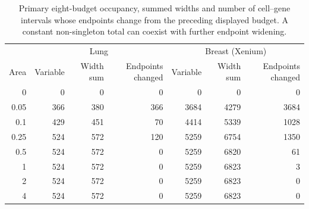 \begin{table}[ht]\centering
\begin{tabular}{rrrrrrr}\toprule
&\multicolumn{3}{c}{Lung}&\multicolumn{3}{c}{Breast (Xenium)}\\
Area&Variable&Width sum&Endpoints changed&Variable&Width sum&Endpoints changed\\\midrule
0 & 0 & 0 & 0 & 0 & 0 & 0\\
0.05 & 366 & 380 & 366 & 3684 & 4279 & 3684\\
0.1 & 429 & 451 & 70 & 4414 & 5339 & 1028\\
0.25 & 524 & 572 & 120 & 5259 & 6754 & 1350\\
0.5 & 524 & 572 & 0 & 5259 & 6820 & 61\\
1 & 524 & 572 & 0 & 5259 & 6823 & 3\\
2 & 524 & 572 & 0 & 5259 & 6823 & 0\\
4 & 524 & 572 & 0 & 5259 & 6823 & 0\\
\bottomrule\end{tabular}
\caption{Primary eight-budget occupancy, summed widths and number of cell--gene intervals whose endpoints change from the preceding displayed budget. A constant non-singleton total can coexist with further endpoint widening.}
\end{table}
